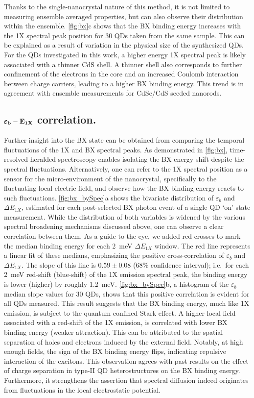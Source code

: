 \documentclass[journal=nalefd, manuscript=letter, layout=twocolumn]{achemso}
\begin{document}
Thanks to the single-nanocrystal nature of this method, it is not limited to measuring ensemble averaged properties, but can also observe their distribution within the ensemble. \autoref{fig:bx}c shows that the BX binding energy increases with the 1X spectral peak position for 30 QDs taken from the same sample. This can be explained as a result of variation in the physical size of the synthesized QDs. For the QDs investigated in this work, a higher energy 1X spectral peak is likely associated with a thinner CdS shell. A thinner shell also corresponds to further confinement of the electrons in the core and an increased Coulomb interaction between charge carriers, leading to a higher BX binding energy. This trend is in agreement with ensemble measurements for CdSe/CdS seeded nanorods\cite{Sitt2009}.

\subsection*{$\bold{\pmb{\varepsilon}_b-E_{1X}}$ correlation.}
Further insight into the BX state can be obtained from comparing the temporal fluctuations of the 1X and BX spectral peaks. As demonstrated in \autoref{fig:bx}, time-resolved heralded spectroscopy enables isolating the BX energy shift despite the spectral fluctuations. Alternatively, one can refer to the 1X spectral position as a sensor for the micro-environment of the nanocrystal, specifically to the fluctuating local electric field, and observe how the BX binding energy reacts to such fluctuations. \autoref{fig:bx_bySpec}a shows the bivariate distribution of $\varepsilon_b$ and $\Delta E_{1X}$, estimated for each post-selected BX photon event of a single QD `on' state measurement. While the distribution of both variables is widened by the various spectral broadening mechanisms discussed above, one can observe a clear correlation between them. As a guide to the eye, we added red crosses to mark the median binding energy for each \SI{2}{meV} $\Delta E_{1X}$ window. The red line represents a linear fit of these medians, emphasizing the positive cross-correlation of $\varepsilon_b$ and $\Delta E_{1X}$. The slope of this line is $0.59\pm0.08$ (68\% confidence interval); i.e.\ for each \SI{2}{meV} red-shift (blue-shift) of the 1X emission spectral peak, the binding energy is lower (higher) by roughly \SI{1.2}{meV}. \autoref{fig:bx_bySpec}b, a histogram of the $\varepsilon_b$ median slope values for 30 QDs, shows that this positive correlation is evident for all QDs measured. This result suggests that the BX binding energy, much like 1X emission, is subject to the quantum confined Stark effect. A higher local field associated with a red-shift of the 1X emission, is correlated with lower BX binding energy (weaker attraction). This can be attributed to the spatial separation of holes and electrons induced by the external field. Notably, at high enough fields, the sign of the BX binding energy flips, indicating repulsive interaction of the excitons. This observation agrees with past results on the effect of charge separation in type-II QD heterostructures on the BX binding energy\cite{Oron2007}. Furthermore, it strengthens the assertion that spectral diffusion indeed originates from fluctuations in the local electrostatic potential.
\end{document}
